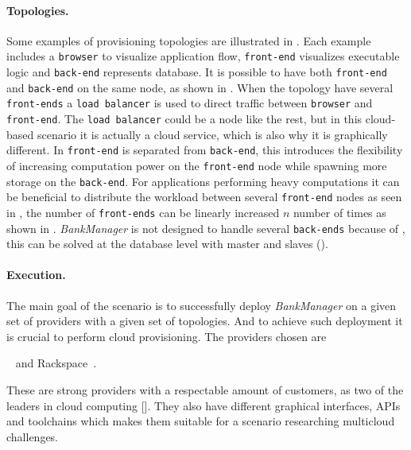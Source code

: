 \paragraph{Topologies.}



Some examples of provisioning topologies are illustrated in .
Each example includes a \texttt{browser} to visualize application flow,
\texttt{front-end} visualizes executable logic and \texttt{back-end} represents database.
It is possible to have both \texttt{front-end} and \texttt{back-end} on the same node, 
as shown in .
When the topology have several \texttt{front-ends} a \texttt{load balancer} is used
to direct traffic between \texttt{browser} and \texttt{front-end}.
The \texttt{load balancer} could be a node like the rest, but in this cloud-based scenario
it is actually a cloud service, which is also why it is graphically different.
In  \texttt{front-end} is separated from \texttt{back-end},
this introduces the flexibility of increasing computation power on the \texttt{front-end} node while spawning more
storage on the \texttt{back-end}.
For applications performing heavy computations it can be beneficial to distribute the workload between several
\texttt{front-end} nodes as seen in , the number of \texttt{front-ends} can be linearly increased
$n$ number of times as shown in .
\emph{BankManager} is not designed to handle several \texttt{back-ends} because of ,
this can be solved at the database level with master and slaves ().

\paragraph{Execution.}

The main goal of the scenario is to successfully deploy \emph{BankManager}
on a given set of providers with a given set of topologies.
And to achieve such deployment it is crucial to perform cloud provisioning.
The providers chosen are
\begin{ii}
  \iitem {}~\cite{aws} and
  \iitem Rackspace~\cite{rackspace}.
\end{ii}
These are strong providers with a respectable amount of customers, as two of the leaders in cloud computing
[].
They also have different graphical interfaces, APIs and toolchains which makes them suitable
for a scenario researching multicloud challenges.

